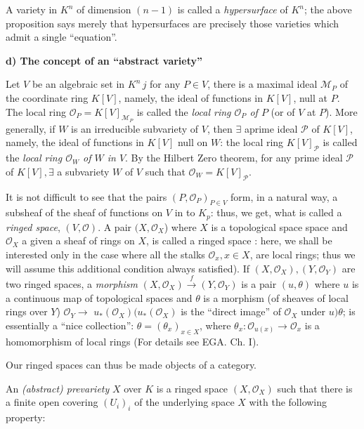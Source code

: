 A variety in $K^n$ of dimension $(n-1)$ is called a
\textit{hypersurface} of $K^n$; the above proposition says merely that
hypersurfaces are precisely those varieties which admit a single
``equation''. 
 
\medskip
\noindent\textbf{d) The concept of an ``abstract variety''} 
	
Let $V$ be an algebraic set in $K^n \, j$ for any $P\in V$, there is a
maximal ideal $\mathcal{M}_P$ of the coordinate ring $K[V]$, namely,
the ideal of functions in $K[V]$, null at $P$. The local ring
$\mathscr{O}_P = K[V]_{\mathcal{M}_P}$ is called the \textit{local
  ring $\mathscr{O}_P$ of $P$} (or of $V$ at $P$). More generally, if
$W$ is an irreducible subvariety of $V$, then $\exists$ a\pageoriginale prime ideal
$\mathcal{P}$ of  $K[V]$, namely, the ideal of functions in $K[V]$
null on $W$: the local ring  $K[V]_{\mathcal{P}}$ is called the
\textit{local ring $\mathscr{O}_W$  of $W$ in $V$}. By the Hilbert
Zero theorem, for any prime ideal $\mathcal{P}$ of $K[V], \exists $ a
subvariety $W$ of $V$ such that $\mathscr{O}_W= K[V]_{\mathcal{P}}$. 
 
 It is not difficult to see that the pairs $(P,\mathscr{O}_P)_{P \in
   V}$ form, in a natural way, a subsheaf of the sheaf of functions on
 $V$ in to $K_p$: thus, we get, what is called a \textit{ringed space},
 $(V,\mathscr{O})$. A pair $(X,\mathscr{O}_X$) where $X$ is a
 topological space space and $\mathscr{O}_X$ a given a sheaf of rings
 on $X$, is called a ringed space : here, we shall be interested only
 in the case where all the stalks $\mathscr{O}_x, x \in X$, are local
 rings; thus we will assume this additional condition always
 satisfied). If $(X,\mathscr{O}_X), (Y,\mathscr{O}_Y)$ are two ringed
 spaces, a \textit{morphism} $(X,\mathscr{O}_X)
 \overset{f}{\rightarrow} (Y,\mathscr{O}_Y)$ is a pair
 $(u,\theta)$ where $u$ is a continuous map of topological spaces
 and $\theta$ is a morphism (of sheaves of local rings over $Y$)
 $\mathscr{O}_Y \rightarrow$  $u_* (\mathscr{O}_X) (u_* (\mathscr{O}_X)$
 is the ``direct image'' of $\mathscr{O}_X$ under $u) \theta$; is
 essentially a ``nice collection'': $\theta = (\theta_x)_{x
   \in X}$, where $\theta_x: \mathscr{O}_{u(x)} \rightarrow
 \mathscr{O}_x$ is a homomorphism of local rings (For details see
 EGA. Ch. I). 
    
Our ringed spaces can thus be made objects of a category.
\begin{defi*} %
  An \textit{(abstract) prevariety} $X$ over $K$ is a ringed space
  $(X,\mathscr{O}_X)$ such that there is a finite open covering
  $(U_i)_i$ of the underlying space $X$ with the following
  property: 
\end{defi*}

